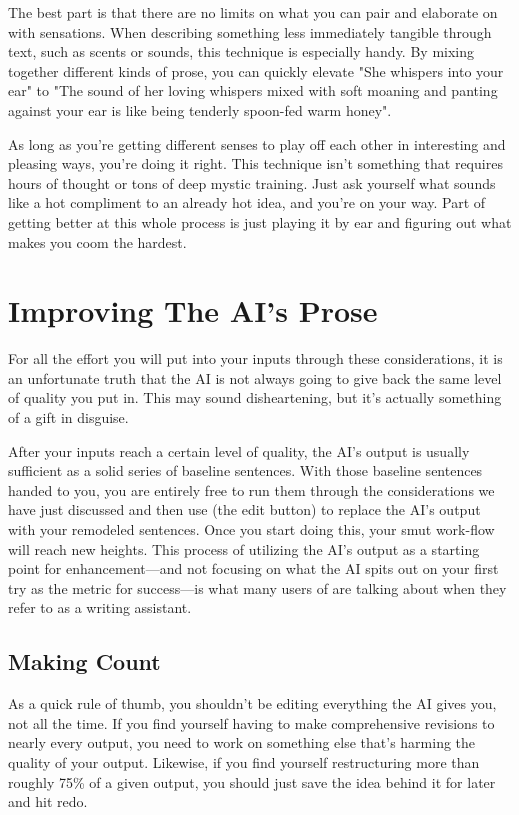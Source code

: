 ﻿\documentclass[Coomer-main.tex]{subfiles}
\begin{document}
The best part is that there are no limits on what you can pair and elaborate on with sensations. When describing something less immediately tangible through text, such as scents or sounds, this technique is especially handy. By mixing together different kinds of prose, you can quickly elevate "She whispers into your ear" to "The sound of her loving whispers mixed with soft moaning and panting against your ear is like being tenderly spoon-fed warm honey".

As long as you're getting different senses to play off each other in interesting and pleasing ways, you're doing it right. This technique isn't something that requires hours of thought or tons of deep mystic training. Just ask yourself what sounds like a hot compliment to an already hot idea, and you're on your way. Part of getting better at this whole process is just playing it by ear and figuring out what makes you coom the hardest.

\section{Improving The AI's Prose}

For all the effort you will put into your inputs through these considerations, it is an unfortunate truth that the AI is not always going to give back the same level of quality you put in. This may sound disheartening, but it's actually something of a gift in disguise.


After your inputs reach a certain level of quality, the AI's output is usually sufficient as a solid series of baseline sentences. With those baseline sentences handed to you, you are entirely free to run them through the considerations we have just discussed and then use \alt (the edit button) to replace the AI’s output with your remodeled sentences. Once you start doing this, your smut work-flow will reach new heights. This process of utilizing the AI's output as a starting point for enhancement—and not focusing on what the AI spits out on your first try as the metric for success—is what many users of \aid are talking about when they refer to \aid as a writing assistant.

\subsection{Making \alt Count}

As a quick rule of thumb, you shouldn't be editing everything the AI gives you, not all the time. If you find yourself having to make comprehensive revisions to nearly every output, you need to work on something else that's harming the quality of your output. Likewise, if you find yourself restructuring more than roughly 75\% of a given output, you should just save the idea behind it for later and hit redo.
\end{document}
